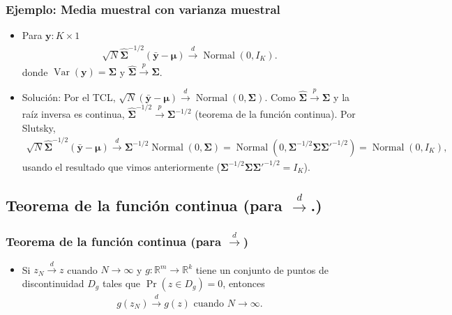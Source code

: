 \documentclass[t, compress, spanish, aspectratio=169]{beamer}
\newcommand{\SR}{\mathbb{R}}
\DeclareMathOperator{\Var}{Var}
\DeclareMathOperator{\N}{Normal}
\newcommand{\pto}{\stackrel{p}{\longrightarrow}}
\newcommand{\dto}{\stackrel{d}{\longrightarrow}}
\begin{document}
	\begin{frame}
		\frametitle{Ejemplo: Media muestral con varianza muestral}
		\small
		\begin{itemize}
			\item Para $\mathbf{y}:K\times 1$
			\begin{align*}
				\sqrt{N} \widehat{\boldsymbol{\Sigma}}^{-1/2}  \left(\bar{\mathbf{y}} - \boldsymbol{\mu}\right)\dto \N(0,I_K).
			\end{align*}
			donde $\Var(\mathbf{y})=\boldsymbol{\Sigma}$ y $\widehat{\boldsymbol{\Sigma}}\pto\boldsymbol{\Sigma}$.
			\item [] Soluci\'on: Por el TCL, $\sqrt{N}(\bar{\mathbf{y}}-\boldsymbol{\mu})\dto \N(0,\boldsymbol{\Sigma})$. Como $\widehat{\boldsymbol{\Sigma}}\pto\boldsymbol{\Sigma}$ y la ra\'iz inversa es continua, $\widehat{\boldsymbol{\Sigma}}^{-1/2}\pto\boldsymbol{\Sigma}^{-1/2}$ (teorema de la funci\'on continua). Por Slutsky,
			\begin{align*}
			\sqrt{N} \widehat{\boldsymbol{\Sigma}}^{-1/2}  \left(\bar{\mathbf{y}} - \boldsymbol{\mu}\right) \dto \boldsymbol{\Sigma}^{-1/2}\N(0,\boldsymbol{\Sigma}) = \N(0,\boldsymbol{\Sigma}^{-1/2}\boldsymbol{\Sigma}\boldsymbol{\Sigma}'^{-1/2}) = \N(0,I_K),
			\end{align*}
			usando el resultado que vimos anteriormente ($\boldsymbol{\Sigma}^{-1/2}\boldsymbol{\Sigma}\boldsymbol{\Sigma}'^{-1/2}=I_K$).
		\end{itemize}
	\end{frame}

		  		
	\subsection{Teorema de la funci\'on continua (para $\dto$.)}
	\begin{frame}
		\frametitle{Teorema de la funci\'on continua (para $\dto$)}
		\begin{itemize}
			\item Si $z_N \dto z$ cuando $N \to \infty$ y $g: \SR^m\to \SR^k$ tiene un conjunto de puntos de discontinuidad $D_g$ tales que $\Pr(z \in D_g)=0$, entonces
			\begin{align*}
			g(z_N) \dto g(z) \text{ cuando }N \to \infty.
			\end{align*}
		\end{itemize}
	\end{frame}
\end{document}
